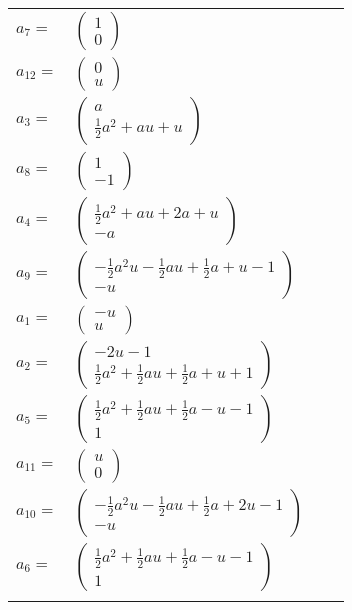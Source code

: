 \documentclass[1p]{elsarticle_modified}
\theoremstyle{definition}
\begin{document}
\begin{tabular}{m{7pt} m{180pt} m{7pt} m{180pt} }
\flushright $a_{7}=$&$\begin{pmatrix}1\\0\end{pmatrix}$ \\
\flushright $a_{12}=$&$\begin{pmatrix}0\\u\end{pmatrix}$ \\
\flushright $a_{3}=$&$\begin{pmatrix}a\\\frac{1}{2} a^2+a u+u\end{pmatrix}$ \\
\flushright $a_{8}=$&$\begin{pmatrix}1\\-1\end{pmatrix}$ \\
\flushright $a_{4}=$&$\begin{pmatrix}\frac{1}{2} a^2+a u+2 a+u\\- a\end{pmatrix}$ \\
\flushright $a_{9}=$&$\begin{pmatrix}-\frac{1}{2} a^2 u-\frac{1}{2} a u+\frac{1}{2} a+u-1\\- u\end{pmatrix}$ \\
\flushright $a_{1}=$&$\begin{pmatrix}- u\\u\end{pmatrix}$ \\
\flushright $a_{2}=$&$\begin{pmatrix}-2 u-1\\\frac{1}{2} a^2+\frac{1}{2} a u+\frac{1}{2} a+u+1\end{pmatrix}$ \\
\flushright $a_{5}=$&$\begin{pmatrix}\frac{1}{2} a^2+\frac{1}{2} a u+\frac{1}{2} a- u-1\\1\end{pmatrix}$ \\
\flushright $a_{11}=$&$\begin{pmatrix}u\\0\end{pmatrix}$ \\
\flushright $a_{10}=$&$\begin{pmatrix}-\frac{1}{2} a^2 u-\frac{1}{2} a u+\frac{1}{2} a+2 u-1\\- u\end{pmatrix}$ \\
\flushright $a_{6}=$&$\begin{pmatrix}\frac{1}{2} a^2+\frac{1}{2} a u+\frac{1}{2} a- u-1\\1\end{pmatrix}$\\&\end{tabular}
\end{document}
